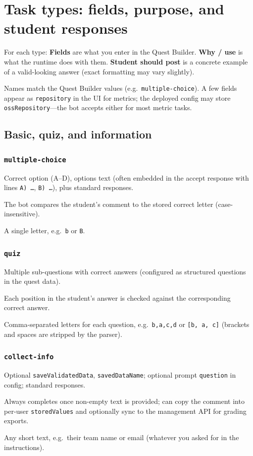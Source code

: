 \documentclass[11pt,a4paper]{article}
\newcommand{\field}[1]{\texttt{#1}}
\newcommand{\subtype}[1]{\subsubsection*{#1}}
\begin{document}
\section{Task types: fields, purpose, and student responses}
\label{sec:tasktypes}

For each type: \textbf{Fields} are what you enter in the Quest Builder. \textbf{Why / use} is what the runtime does with them. \textbf{Student should post} is a concrete example of a valid-looking answer (exact formatting may vary slightly).

Names match the Quest Builder values (e.g.\ \field{multiple-choice}). A few fields appear as \field{repository} in the UI for metrics; the deployed config may store \field{ossRepository}---the bot accepts either for most metric tasks.

\subsection{Basic, quiz, and information}

\subtype{\texttt{multiple-choice}}
\begin{description}[style=nextline,leftmargin=0cm]
  \item[Fields] Correct option (A--D), options text (often embedded in the accept response with lines \texttt{A) \ldots}, \texttt{B) \ldots}), plus standard responses.
  \item[Why / use] The bot compares the student's comment to the stored correct letter (case-insensitive).
  \item[Student should post] A single letter, e.g.\ \texttt{b} or \texttt{B}.
\end{description}

\subtype{\texttt{quiz}}
\begin{description}[style=nextline,leftmargin=0cm]
  \item[Fields] Multiple sub-questions with correct answers (configured as structured questions in the quest data).
  \item[Why / use] Each position in the student's answer is checked against the corresponding correct answer.
  \item[Student should post] Comma-separated letters for each question, e.g.\ \texttt{b,a,c,d} or \texttt{[b, a, c]} (brackets and spaces are stripped by the parser).
\end{description}

\subtype{\texttt{collect-info}}
\begin{description}[style=nextline,leftmargin=0cm]
  \item[Fields] Optional \field{saveValidatedData}, \field{savedDataName}; optional prompt \field{question} in config; standard responses.
  \item[Why / use] Always completes once non-empty text is provided; can copy the comment into per-user \texttt{storedValues} and optionally sync to the management API for grading exports.
  \item[Student should post] Any short text, e.g.\ their team name or email (whatever you asked for in the instructions).
\end{description}
\end{document}
